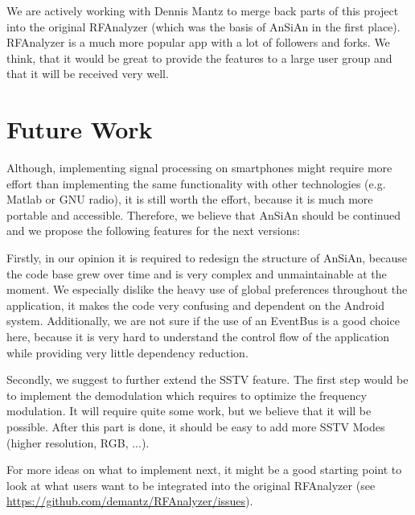 We are actively working with Dennis Mantz to merge back parts of this project into the original RFAnalyzer (which was the basis of AnSiAn in the first place). RFAnalyzer is a much more popular app with a lot of followers and forks. We think, that it would be great to provide the features to a large user group and that it will be received very well. 

\section{Future Work}

Although, implementing signal processing on smartphones might require more effort than implementing the same functionality with other technologies (e.g. Matlab or GNU radio), it is still worth the effort, because it is much more portable and accessible. Therefore, we believe that \ac{AnSiAn} should be continued and we propose the following features for the next versions:

Firstly, in our opinion it is required to redesign the structure of \ac{AnSiAn}, because the code base grew over time and is very complex and unmaintainable at the moment. We especially dislike the heavy use of global preferences throughout the application, it makes the code very confusing and dependent on the Android system. Additionally, we are not sure if the use of an EventBus is a good choice here, because it is very hard to understand the control flow of the application while providing very little dependency reduction. 

Secondly, we suggest to further extend the SSTV feature. The first step would be to implement the demodulation which requires to optimize the frequency modulation. It will require quite some work, but we believe that it will be possible. After this part is done, it should be easy to add more SSTV Modes (higher resolution, RGB, ...). 

For more ideas on what to implement next, it might be a good starting point to look at what users want to be integrated into the original RFAnalyzer (see \url{https://github.com/demantz/RFAnalyzer/issues}). 



